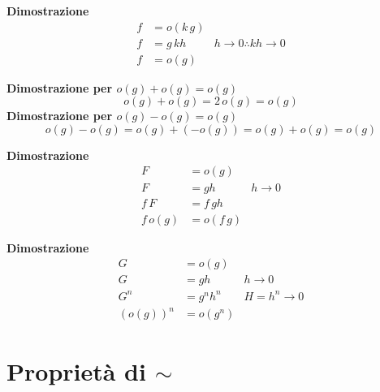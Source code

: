 \documentclass[../../analisi1]{subfiles}
\begin{document}
            \begin{description}[style=nextline]
                \item[\(o(k \, g) = k \, o(g) = o(g)\)]
                    \textbf{Dimostrazione}
                    \begin{align*}
                        f &= o(k \, g)\\
                        f &= g \, kh & h \to 0 \therefore kh \to 0\\
                        f &= o(g)
                    \end{align*}
                \item[\(o(g) \pm o(g) = o(g)\)]
                    \textbf{Dimostrazione per \(o(g) + o(g) = o(g)\)}
                    \[
                        o(g) + o(g) = 2 \, o(g) = o(g)
                    \]
                    \textbf{Dimostrazione per \(o(g) - o(g) = o(g)\)}
                    \[
                        o(g) - o(g) = o(g) + (-o(g)) = o(g) + o(g) = o(g)
                    \]
                \item[\(f \, o(g) = o(f \, g)\)]
                    \textbf{Dimostrazione}
                    \begin{align*}
                        F &= o(g)\\
                        F &= gh & h \to 0\\
                        f \, F &= f \, gh\\
                        f \, o(g) &= o(f \, g)
                    \end{align*}
                \item[\({(o(g))}^n = o(g^n) \quad \forall n \in \mathbb{R}^+\)]
                    \textbf{Dimostrazione}
                    \begin{align*}
                        G &= o(g)\\
                        G &= gh & h \to 0\\
                        G^n &= g^n h^n & H = h^n \to 0\\
                        {(o(g))}^n &= o(g^n)
                    \end{align*}
            \end{description}

        \section*{Proprietà di \(\sim\)}
        
\end{document}
